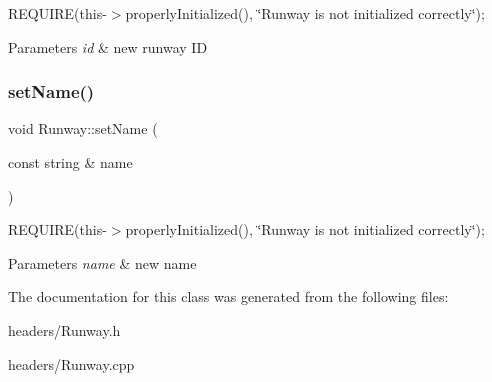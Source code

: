 R\+E\+Q\+U\+I\+RE(this-\/$>$properly\+Initialized(), \char`\"{}\+Runway is not initialized correctly\char`\"{}); 
\begin{DoxyParams}{Parameters}
{\em id} & new runway ID \\
\hline
\end{DoxyParams}
\mbox{\label{class_runway_ab601d0a69ecffc0042d69cf0eb0cdaba}} 
\subsubsection{\texorpdfstring{set\+Name()}{setName()}}
{\footnotesize\ttfamily void Runway\+::set\+Name (\begin{DoxyParamCaption}\item[{const string \&}]{name }\end{DoxyParamCaption})}

R\+E\+Q\+U\+I\+RE(this-\/$>$properly\+Initialized(), \char`\"{}\+Runway is not initialized correctly\char`\"{}); 
\begin{DoxyParams}{Parameters}
{\em name} & new name \\
\hline
\end{DoxyParams}


The documentation for this class was generated from the following files\+:\begin{DoxyCompactItemize}
\item 
headers/Runway.\+h\item 
headers/Runway.\+cpp\end{DoxyCompactItemize}
